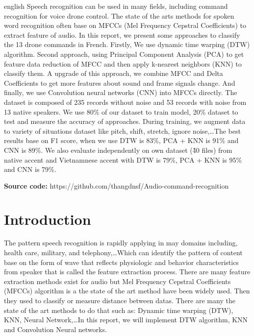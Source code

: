 \documentclass[%
  article,%
  10pt,%
  a4paper,%
  fleqn,%
  oneside,%
  sumario = tradicional,%
  chapter = TITLE,%
  section = TITLE,%
]{abntex2}
\author{
  21906085\\
  Duc Thang, NGUYEN\\
  \texttt{duc-thang.nguyen@univ-tlse3.fr}
  \and
   21902771\\
  Clement, POULL\\
  \texttt{clement.poull@univ-tlse3.fr}
}
\begin{document}
\pretextual%

\begin{paginadetitulo}%

\begin{ambienteresumo}[Abstract]%
\begin{otherlanguage*}{english}%
Speech recognition can be used in many fields, including command recognition for voice drone control. The state of the arts methods for spoken word recognition often base on MFCCs (Mel Frequency Cepstral Coefficients) to extract feature of audio. In this report, we present some approaches to classify the 13 drone commands in French. Firstly, We use dynamic time warping (DTW) algorithm. Second approach, using Principal Component Analysis (PCA) to get feature data reduction of MFCC and then apply k-nearest neighbors (KNN) to classify them. A upgrade of this approach, we combine MFCC and Delta Coefficients to get more features about sound and frame signals change. And finally, we use Convolution neural networks (CNN) into MFCCs directly. The dataset is composed of  235 records without noise and 53 records with noise from 13 native speakers. We use 80\% of our dataset to train model, 20\% dataset to test and measure the accuracy of approaches. During training, we augment data to variety of situations dataset like pitch, shift, stretch, ignore noise,\dots The best results base on F1 score, when we use DTW is 83\%, PCA + KNN is 91\% and CNN is 89\%. We also evaluate independently on own dataset (\~ 40 files) from native accent and Vietnamnese accent with DTW is 79\%, PCA + KNN is 95\% and CNN is 79\%.

\smallskip

\textbf{Source code:} https://github.com/thangdnsf/Audio-command-recognition

\end{otherlanguage*}
\end{ambienteresumo}

\end{paginadetitulo}

\textual%

\section{Introduction}\label{sec:intro}

The pattern speech recognition is rapidly applying in may domains including, health care, military, and telephony,\dots Which can identify the pattern of content base on the form of wave that reflects physiologic and behavior characteristics from speaker that is called the feature extraction process. There are many feature extraction methods exist for audio but Mel Frequency Cepstral Coefficients (MFCCs) algorithm is a the state of the art method have been widely used. Then they used to classify or measure distance between datas. There are many the state of the art methods to do that such as: Dynamic time warping (DTW), KNN, Neural Network,\dots In this report, we will implement DTW algorithm, KNN and Convolution Neural networks.
\end{document}
